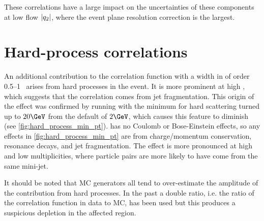 These correlations have a large impact on the uncertainties of these components at low flow $|q_{2}|$, where the event plane resolution correction is the largest.



\FloatBarrier
\section{Hard-process correlations}
\label{sec:jet_frag}

An additional contribution to the correlation function with a width in \qinv of order 0.5--1 \GeV\ arises from hard processes in the event.
It is more prominent at high \kt, which suggests that the correlation comes from jet fragmentation.
This origin of the effect was confirmed by running \Hijing with the minimum \pt for hard scattering turned up to $20 \GeV$ from the default of $2 \GeV$, which causes this feature to diminish (see \cref{fig:hard_process_min_pt}).
\Hijing has no Coulomb or Bose-Einstein effects, so any effects in \cref{fig:hard_process_min_pt} are from charge/momentum conservation, resonance decays, and jet fragmentation.
The effect is more pronounced at high \kt and low multiplicities, where particle pairs are more likely to have come from the same mini-jet.

It should be noted that \ac{MC} generators all tend to over-estimate the amplitude of the contribution from hard processes.
In the past a double ratio, i.e. the ratio of the correlation function in data to \ac{MC}, has been used but this produces a suspicious depletion in the affected \qinv region.


